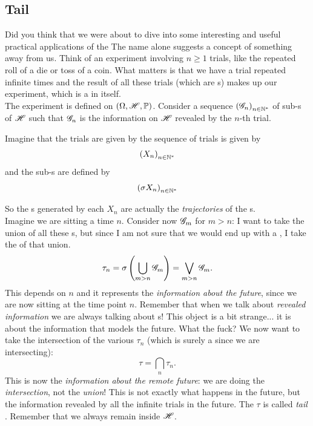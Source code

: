 \documentclass{report}
\begin{document}
\subsection{Tail \sa}
Did you think that we were about to dive into some interesting and useful practical applications of the The name alone suggests a concept of something away from us. Think of an experiment involving $n\geq 1$ trials, like the repeated roll of a die or toss of a coin. What matters is that we have a trial repeated infinite times and the result of all these trials (which are \rv s) makes up our experiment, which is a \rv{} in itself. \\
The experiment is defined on $(\Omega,\mathscr{H},\mathbb{P})$. Consider a sequence ${(\mathscr{G}_n)}_{n\in\mathbb{N}^{*}}$ of sub-\sa s of $\mathscr{H}$ such that $\mathscr{G}_n$ is the information on $\mathscr{H}$ revealed by the $n$-th trial. 
\begin{example}
	Imagine that the trials are given by the sequence of trials is given by
	\[{(X_n)}_{n\in\mathbb{N}^{*}}\]
	and the sub-\sa s are defined by
	\[{(\sigma X_n)}_{n\in\mathbb{N}^{*}}\]
\end{example}
So the \sa s generated by each $X_n$ are actually the \textit{trajectories} of the \rv s.\\
Imagine we are sitting a time $n$. Consider now $\mathscr{G}_m$ for $m>n$: I want to take the union of all these \sa s, but since I am not sure that we would end up with a \sa, I take the \sa{} of that union.
\[\tau_n=\sigma\left(\bigcup_{m>n}\mathscr{G}_m\right)=\bigvee_{m>n}\mathscr{G}_m.\]
This \sa{} depends on $n$ and it represents the \textit{information about the future}, since we are now sitting at the time point $n$. Remember that when we talk about \textit{revealed information} we are always talking about \sa s!
This object is a bit strange... it is about the information that models the future. What the fuck? We now want to take the intersection of the various $\tau_n$ (which is surely a \sa{} since we are intersecting):
\[\tau=\bigcap_n\tau_n.\]
This is now the \textit{information about the remote future}: we are doing the \textit{intersection}, not the \textit{union}! This is not exactly what happens in the future, but the information revealed by all the infinite trials in the future. The \sa{} $\tau$ is called \emph{tail \sa{}}. Remember that we always remain inside $\mathscr{H}$.
\end{document}
